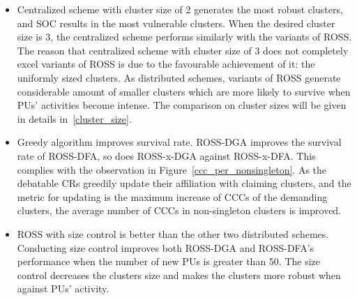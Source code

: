 \documentclass[10pt,journal,compsoc]{IEEEtran}
\theoremstyle{mytheoremstyle}
\theoremstyle{mytheoremstyle}
\theoremstyle{mytheoremstyle}
\begin{document}
\begin{itemize}
\item Centralized scheme with cluster size of 2 generates the most robust clusters, and SOC results in the most vulnerable clusters.
When the desired cluster size is 3, the centralized scheme performs similarly with the variants of ROSS.
The reason that centralized scheme with cluster size of 3 does not completely excel variants of ROSS is due to the favourable achievement of it: the uniformly sized clusters.
As distributed schemes, variants of ROSS generate considerable amount of smaller clusters which are more likely to survive when PUs' activities become intense.
The comparison on cluster sizes will be given in details in~\ref{cluster_size}.


\item Greedy algorithm improves survival rate. 
ROSS-DGA improves the survival rate of ROSS-DFA, so does ROSS-x-DGA against ROSS-x-DFA.
This complies with the observation in Figure~\ref{ccc_per_nonsingleton}.
As the debatable CRs greedily update their affiliation with claiming clusters, and the metric for updating is the maximum increase of CCCs of the demanding clusters, the average number of CCCs in non-singleton clusters is improved. 

\item ROSS with size control is better than the other two distributed schemes.
Conducting size control improves both ROSS-DGA and ROSS-DFA's performance when the number of new PUs is greater than 50.
The size control decreases the clusters size and makes the clusters more robust when against PUs' activity.

\end{itemize}




%
%
\end{document}
